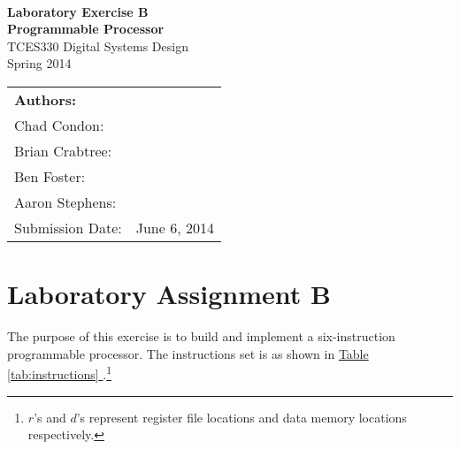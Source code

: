 \documentclass[12pt]{article}
\begin{document}
\begin{titlepage}
    \center
    \qquad\\[7cm]
    {\huge \bfseries Laboratory Exercise B} \\[.5cm]
    {\huge \bfseries Programmable Processor} \\[1.0cm]
    {\large TCES330 Digital Systems Design} \\[.5cm]
    {\large Spring 2014} \\[1.5cm]

    \begin{tabular}{ll}
        \multicolumn{2}{l}{\textbf{Authors:}}           \\
        Chad Condon:        & \underline{\hspace{5cm}}  \\
        Brian Crabtree:     & \underline{\hspace{5cm}}  \\
        Ben Foster:         & \underline{\hspace{5cm}}  \\
        Aaron Stephens:     & \underline{\hspace{5cm}}  \\
        Submission Date:    & June 6, 2014              \\
    \end{tabular}

\end{titlepage}

\tableofcontents
\pagebreak

\section*{Laboratory Assignment B}  \FloatBarrier

The purpose of this exercise is to build and implement a six-instruction programmable processor.
The instructions set is as shown in \hyperref[tab:instructions]{Table \ref*{tab:instructions} }.\footnote{%
    $r$'s and $d$'s represent register file locations and data memory locations respectively.
}
\end{document}

